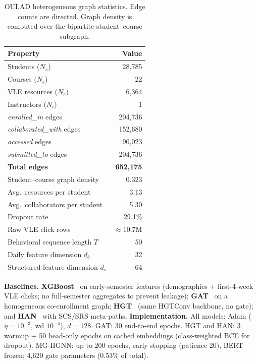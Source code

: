 \documentclass[sigconf,review]{acmart}
\begin{document}
\begin{table}[t]
\centering
\caption{OULAD heterogeneous graph statistics.
Edge counts are directed. Graph density is computed
over the bipartite student--course subgraph.}
\label{tab:graph_stats}
\begin{tabular}{lr}
\toprule
\textbf{Property} & \textbf{Value} \\
\midrule
Students ($N_s$) & 28,785 \\
Courses ($N_c$) & 22 \\
VLE resources ($N_r$) & 6,364 \\
Instructors ($N_i$) & 1 \\
\midrule
\textit{enrolled\_in} edges & 204,736 \\
\textit{collaborated\_with} edges & 152,680 \\
\textit{accessed} edges & 90,023 \\
\textit{submitted\_to} edges & 204,736 \\
\textbf{Total edges} & \textbf{652,175} \\
\midrule
Student--course graph density & 0.323 \\
Avg.\ resources per student & 3.13 \\
Avg.\ collaborators per student & 5.30 \\
\midrule
Dropout rate & 29.1\% \\
Raw VLE click rows & ${\approx}10.7$M \\
Behavioral sequence length $T$ & 50 \\
Daily feature dimension $d_b$ & 32 \\
Structured feature dimension $d_s$ & 64 \\
\bottomrule
\end{tabular}
\end{table}

\textbf{Baselines.}
\textbf{XGBoost}~\citep{chen2016xgboost} on early-semester
features (demographics + first-4-week VLE clicks; no
full-semester aggregates to prevent leakage);
\textbf{GAT}~\citep{velivckovic2018graph} on a homogeneous
co-enrollment graph;
\textbf{HGT}~\citep{hu2020heterogeneous} (same HGTConv
backbone, no gate); and
\textbf{HAN}~\citep{wang2019heterogeneous} with SCS/SRS
meta-paths.
\textbf{Implementation.} All models: Adam ($\eta{=}10^{-3}$,
wd $10^{-4}$), $d{=}128$. GAT: 30 end-to-end epochs.
HGT and HAN: 3 warmup $+$ 50 head-only epochs on cached
embeddings (class-weighted BCE for dropout). MG-HGNN: up
to 200 epochs, early stopping (patience 20), BERT frozen;
4{,}620 gate parameters (0.53\% of total).
\end{document}
